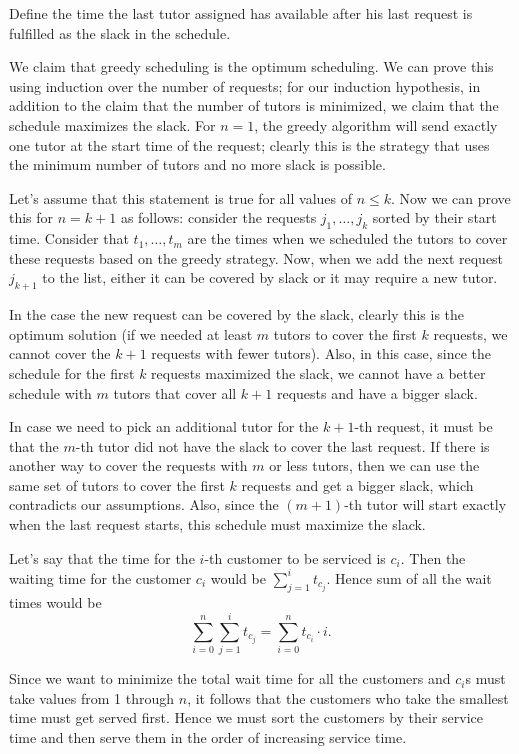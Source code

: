 Define the time the last tutor assigned has available after his last request
is fulfilled as the slack in the schedule.

We claim that greedy scheduling is the optimum scheduling. 
We can prove this using induction over the number of requests; 
for our induction hypothesis, in addition to the claim that
the number of tutors is minimized, we claim that the schedule maximizes the slack.
For $n=1$, the greedy algorithm will send exactly one tutor
at the start time of the request; clearly this is the strategy that uses the minimum number of tutors and no more slack is possible.

Let's assume that this statement is true for all values of $n \le k$. 
 Now we can prove this for $n = k +1$ as follows: consider the requests
 $j_1,\ldots,j_k$ sorted by their start time. Consider that
 $t_1,\ldots,t_m$ are the times when we scheduled the tutors to cover
 these requests based on the greedy strategy. Now, when we add the next
 request $j_{k+1}$ to the list, either it can be covered by slack or
 it may require a new tutor.

In the case the new request can be
 covered by the slack, clearly this is the optimum solution (if we
 needed at least $m$ tutors to cover the first $k$ requests, we
 cannot cover the $k+1$ requests with fewer tutors). Also, in this case,
 since the schedule for the first $k$ requests
 maximized the slack, we cannot have a
 better schedule with $m$ tutors that cover all $k+1$ requests
 and have a bigger slack.

In case we need to pick an additional tutor for the $k+1$-th request,
it must be that the $m$-th
tutor did not have the slack to cover the last request. If there is
another way to cover the requests with $m$ or less tutors, then we can use
the same set of tutors to cover the first $k$ requests and get a bigger slack,
which contradicts our assumptions. Also, since the $(m+1)$-th tutor
will start exactly when the last request starts, this schedule must maximize the slack.

Let's say that the time for the $i$-th customer to be serviced is $c_i$. Then the
waiting time for the customer $c_i$ would be $\sum_{j=1}^i t_{c_j}$.
Hence sum of all the wait times would be
\[\sum_{i=0}^n \sum_{j=1}^i t_{c_j} = \sum_{i=0}^n t_{c_i}\cdot i . \]

Since we want to minimize the total wait time for all the customers
and $c_i$s must take values from 1 through $n$, it follows that the
customers who take the smallest time must get served first. Hence we
must sort the customers by their service time and then serve them in
the order of increasing service time.

